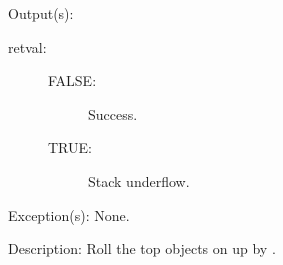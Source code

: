 \begin{capi}
\begin{capilist}
\begin{description}
		\end{description}
	\item[Output(s): ]
		\begin{description}\item[]
		\item[retval: ]
			\begin{description}\item[]
			\item[FALSE: ]
				Success.
			\item[TRUE: ]
				Stack underflow.
			\end{description}
		\end{description}
	\item[Exception(s): ] None.
	\item[Description: ]
		Roll the top  objects on  up by
		.
	\end{capilist}
\end{capi}
